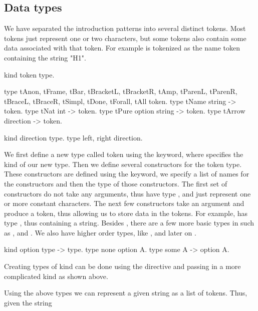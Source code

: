 \documentclass[thesis.tex]{subfiles}
\begin{document}
{\subsection{Data types}\label{sssec:datatypes}
We have separated the introduction patterns into several distinct tokens. Most tokens just represent one or two characters, but some tokens also contain some data associated with that token. For example  is tokenized as the name token containing the string "H1".
\begin{elpicode}
  kind token type.

  type tAnon, tFrame, tBar, tBracketL, tBracketR, tAmp,
       tParenL, tParenR, tBraceL, tBraceR, tSimpl,
       tDone, tForall, tAll token.
  type tName string -> token.
  type tNat int -> token.
  type tPure option string -> token.
  type tArrow direction -> token.

  kind direction type.
  type left, right direction.
\end{elpicode}
We first define a new type called token using the  keyword, where  specifies the kind of our new type. Then we define several constructors for the token type. These constructors are defined using the  keyword, we specify a list of names for the constructors and then the type of those constructors. The first set of constructors do not take any arguments, thus have type , and just represent one or more constant characters. The next few constructors take an argument and produce a token, thus allowing us to store data in the tokens. For example,  has type , thus containing a string. Besides , there are a few more basic types in \elpi such as ,  and . We also have higher order types, like , and later on .
\begin{elpicode}
  kind option type -> type.
  type none option A.
  type some A -> option A.
\end{elpicode}
Creating types of kind  can be done using the  directive and passing in a more complicated kind as shown above.

Using the above types we can represent a given string as a list of tokens. Thus, given the string \elpii{"[H %
\begin{elpicode}
  [tBracketL, tName "H", tPure (some "H'"), tBracketR]
\end{elpicode}

}}
\end{document}
